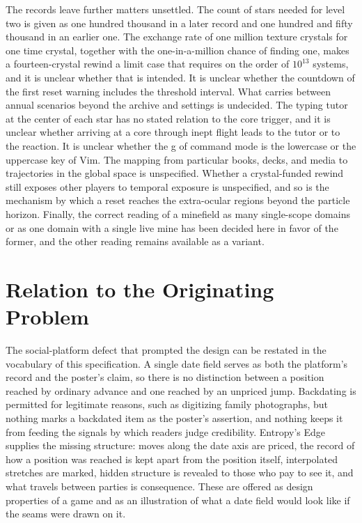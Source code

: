 \documentclass[11pt]{article}
\begin{document}
The records leave further matters unsettled. The count of stars needed for level two is given as one hundred thousand in a later record and one hundred and fifty thousand in an earlier one. The exchange rate of one million texture crystals for one time crystal, together with the one-in-a-million chance of finding one, makes a fourteen-crystal rewind a limit case that requires on the order of $10^{13}$ systems, and it is unclear whether that is intended. It is unclear whether the countdown of the first reset warning includes the threshold interval. What carries between annual scenarios beyond the archive and settings is undecided. The typing tutor at the center of each star has no stated relation to the core trigger, and it is unclear whether arriving at a core through inept flight leads to the tutor or to the reaction. It is unclear whether the g of command mode is the lowercase or the uppercase key of Vim. The mapping from particular books, decks, and media to trajectories in the global space is unspecified. Whether a crystal-funded rewind still exposes other players to temporal exposure is unspecified, and so is the mechanism by which a reset reaches the extra-ocular regions beyond the particle horizon. Finally, the correct reading of a minefield as many single-scope domains or as one domain with a single live mine has been decided here in favor of the former, and the other reading remains available as a variant.

\section{Relation to the Originating Problem}

The social-platform defect that prompted the design can be restated in the vocabulary of this specification. A single date field serves as both the platform's record and the poster's claim, so there is no distinction between a position reached by ordinary advance and one reached by an unpriced jump. Backdating is permitted for legitimate reasons, such as digitizing family photographs, but nothing marks a backdated item as the poster's assertion, and nothing keeps it from feeding the signals by which readers judge credibility. Entropy's Edge supplies the missing structure: moves along the date axis are priced, the record of how a position was reached is kept apart from the position itself, interpolated stretches are marked, hidden structure is revealed to those who pay to see it, and what travels between parties is consequence. These are offered as design properties of a game and as an illustration of what a date field would look like if the seams were drawn on it.
\end{document}
